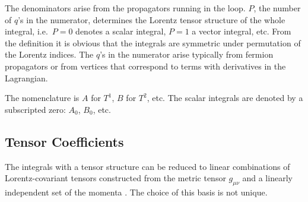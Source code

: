 \documentclass[twoside,12pt]{report}
\def\ie{i.e.\ }
\begin{document}
The denominators arise from the propagators running in the loop.
$P$, the number of $q$'s in the numerator, determines the Lorentz tensor
structure of the whole integral, \ie $P = 0$ denotes a scalar integral,
$P = 1$ a vector integral, etc.  From the definition it is obvious that the
integrals are symmetric under permutation of the Lorentz indices.  The
$q$'s in the numerator arise typically from fermion propagators or from
vertices that correspond to terms with derivatives in the Lagrangian.%
%

The nomenclature is $A$ for $T^1$, $B$ for $T^2$, etc.  The scalar
integrals are denoted by a subscripted zero: $A_0$, $B_0$, etc.


\subsection{Tensor Coefficients}

%
%
The integrals with a tensor structure can be reduced to linear
combinations of Lorentz-covariant tensors constructed from the metric
tensor $g_{\mu\nu}$ and a linearly independent set of the momenta
\cite{PaV79}.  The choice of this basis is not unique.
\end{document}
